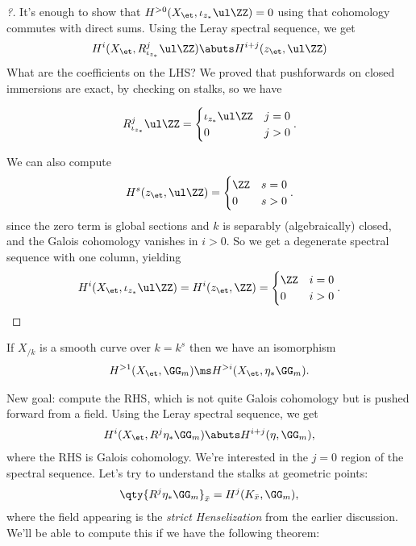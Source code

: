 \begin{proof}[?]

It's enough to show that \(H^{>0}(X_\et, \iota_{z_*} \ul \ZZ) = 0\)
using that cohomology commutes with direct sums. Using the Leray
spectral sequence, we get
\begin{align*}
H^i(X_\et, R^j_{\iota_{z_*}} \ul \ZZ)\abuts H^{i+j}(z_\et, \ul \ZZ)
\end{align*} What are the coefficients on the LHS? We proved that
pushforwards on closed immersions are exact, by checking on stalks, so
we have

\begin{align*}  
R^j _{\iota_{z_*}} \ul \ZZ
=
\begin{cases}
\iota_{z_*} \ul \ZZ & j = 0 \\
0 & j > 0
\end{cases}
.\end{align*}

We can also compute
\begin{align*}  
H^s(z_\et, \ul \ZZ)
=
\begin{cases}
\ZZ & s = 0 \\
0 & s>0
\end{cases}
.\end{align*} since the zero term is global sections and \(k\) is
separably (algebraically) closed, and the Galois cohomology vanishes in
\(i>0\). So we get a degenerate spectral sequence with one column,
yielding
\begin{align*}  
H^i (X_\et, \iota_{z_*} \ul \ZZ) 
=
H^i(z_{\et}, \ZZ)
=
\begin{cases}
\ZZ & i = 0 \\
0 & i> 0
\end{cases}
.\end{align*}

\end{proof}

\begin{corollary}[?]

If \(X_{/k}\) is a smooth curve over \(k=k^{s}\) then we have an
isomorphism
\begin{align*}  
H^{>1}(X_\et, \GG_m) \ms H^{>i}(X_\et, \eta_* \GG_m)
.\end{align*}

\end{corollary}

New goal: compute the RHS, which is not quite Galois cohomology but is
pushed forward from a field. Using the Leray spectral sequence, we get
\begin{align*}  
H^i(X_\et, R^j \eta_* \GG_m)
\abuts
H^{i+j}(\eta, \GG_m)
,\end{align*} where the RHS is Galois cohomology. We're interested in
the \(j=0\) region of the spectral sequence. Let's try to understand the
stalks at geometric points:
\begin{align*}  
\qty{R^j \eta_* \GG_m}_{\bar x}
=
H^j(K_{\bar x}, \GG_m)
,\end{align*} where the field appearing is the \emph{strict
Henselization} from the earlier discussion. We'll be able to compute
this if we have the following theorem:

